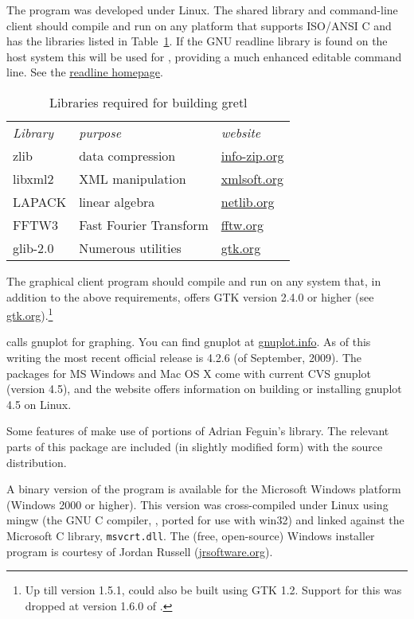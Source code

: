 The program was developed under Linux. The shared library and
command-line client should compile and run on any platform that
supports ISO/ANSI C and has the libraries listed in
Table~\ref{tab:depend}.  If the GNU readline library is found on the
host system this will be used for , providing a much
enhanced editable command line.  See the
\href{http://cnswww.cns.cwru.edu/~chet/readline/rltop.html}{readline
  homepage}.

\begin{table}[htbp]
  \centering
  \begin{tabular}{lll}
\textit{Library} & \textit{purpose} & \textit{website} \\ [4pt]
zlib & data compression &  
   \href{http://www.info-zip.org/pub/infozip/zlib/}{info-zip.org} \\
libxml2 & XML manipulation &
   \href{http://xmlsoft.org/}{xmlsoft.org} \\
LAPACK & linear algebra & 
   \href{http://www.netlib.org/lapack/}{netlib.org} \\
FFTW3 & Fast Fourier Transform & 
   \href{http://www.fftw.org/}{fftw.org} \\
glib-2.0 & Numerous utilities & 
  \href{http://www.gtk.org/}{gtk.org}
  \end{tabular}
  \caption{Libraries required for building gretl}
  \label{tab:depend}
\end{table}

The graphical client program should compile and run on any system
that, in addition to the above requirements, offers GTK version 2.4.0
or higher (see \href{http://www.gtk.org/}{gtk.org}).\footnote{Up till
  version 1.5.1,  could also be built using GTK 1.2.
  Support for this was dropped at version 1.6.0 of .}
  
 calls gnuplot for graphing. You can find gnuplot at
\href{http://www.gnuplot.info/}{gnuplot.info}.  As of this writing the
most recent official release is 4.2.6 (of September, 2009).  The 
 packages for MS Windows and Mac OS X come with 
current CVS gnuplot (version 4.5), and the  website
offers information on building or installing gnuplot 4.5 on
Linux.
  
Some features of  make use of portions of Adrian Feguin's
 library.  The relevant parts of this package are
included (in slightly modified form) with the  source
distribution.
  
A binary version of the program is available for the Microsoft Windows
platform (Windows 2000 or higher). This version was cross-compiled
under Linux using mingw (the GNU C compiler, , ported for use
with win32) and linked against the Microsoft C library,
\verb+msvcrt.dll+.  The (free, open-source) Windows installer program
is courtesy of Jordan Russell
(\href{http://www.jrsoftware.org/}{jrsoftware.org}).

